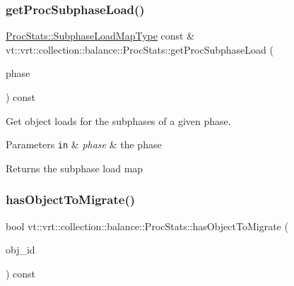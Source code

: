 \subsubsection{\texorpdfstring{get\+Proc\+Subphase\+Load()}{getProcSubphaseLoad()}}
{\footnotesize\ttfamily \hyperlink{structvt_1_1vrt_1_1collection_1_1balance_1_1_proc_stats_ab2312e47e475143cf295d45cb2493f48}{Proc\+Stats\+::\+Subphase\+Load\+Map\+Type} const  \& vt\+::vrt\+::collection\+::balance\+::\+Proc\+Stats\+::get\+Proc\+Subphase\+Load (\begin{DoxyParamCaption}\item[{\hyperlink{namespacevt_a46ce6733d5cdbd735d561b7b4029f6d7}{Phase\+Type}}]{phase }\end{DoxyParamCaption}) const}



Get object loads for the subphases of a given phase. 


\begin{DoxyParams}[1]{Parameters}
\mbox{\tt in}  & {\em phase} & the phase\\
\hline
\end{DoxyParams}
\begin{DoxyReturn}{Returns}
the subphase load map 
\end{DoxyReturn}
\mbox{\label{structvt_1_1vrt_1_1collection_1_1balance_1_1_proc_stats_a8ee38def0f38270f9b3dbbae19b027ce}} 
\subsubsection{\texorpdfstring{has\+Object\+To\+Migrate()}{hasObjectToMigrate()}}
{\footnotesize\ttfamily bool vt\+::vrt\+::collection\+::balance\+::\+Proc\+Stats\+::has\+Object\+To\+Migrate (\begin{DoxyParamCaption}\item[{\hyperlink{namespacevt_1_1vrt_1_1collection_1_1balance_a14c8d2c972f2913aa3f1636e5be0a120}{Element\+I\+D\+Type}}]{obj\+\_\+id }\end{DoxyParamCaption}) const}



